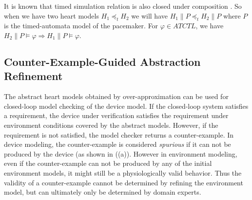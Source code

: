 It is known that timed simulation relation is also closed under composition \cite{simulation}. 
So when we have two heart models $H_1\preceq_t H_2$ we will have $H_1\| P\preceq_t H_2\| P$ where $P$ is the timed-automata model of the pacemaker. 
For $\varphi\in ATCTL$, we have $H_2\| P\models\varphi\Rightarrow H_1\| P\models\varphi$. 

\subsection{Counter-Example-Guided Abstraction Refinement}
%
The abstract heart models obtained by over-approximation can be used for closed-loop model checking of the device model. 
If the closed-loop system satisfies a requirement, the device under verification satisfies the requirement under environment conditions covered by the abstract models. 
However, if the requirement is not satisfied, the model checker returns a counter-example. 
In device modeling, the counter-example is considered \emph{spurious} if it can not be produced by the device (as shown in ((a)).
However in environment modeling, even if the counter-example can not be produced by any of the initial environment models, it might still be a physiologically valid behavior.
Thus the validity of a counter-example cannot be determined by refining the environment model, but can ultimately only be determined by domain experts. 

